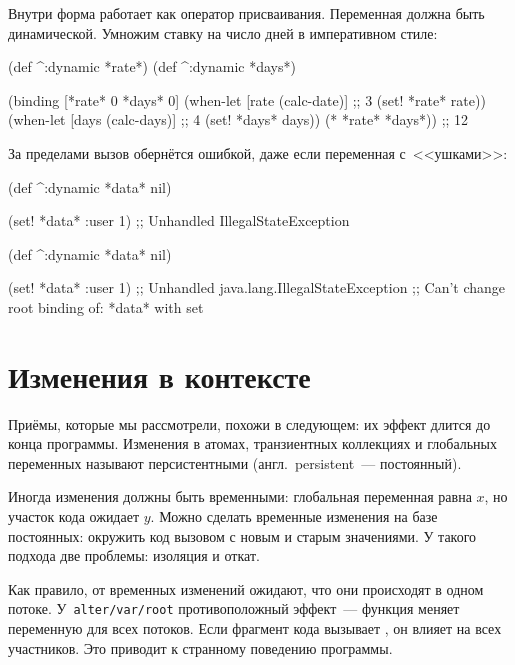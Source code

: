 \fi

Внутри  форма  работает как оператор
присваивания. Переменная должна быть динамической. Умножим ставку на число дней
в императивном стиле:

\begin{clojure}
(def ^:dynamic *rate*)
(def ^:dynamic *days*)

(binding [*rate* 0
          *days* 0]
  (when-let [rate (calc-date)] ;; 3
    (set! *rate* rate))
  (when-let [days (calc-days)] ;; 4
    (set! *days* days))
  (* *rate* *days*))
;; 12
\end{clojure}

За пределами  вызов  обернётся ошибкой, даже если
переменная с~<<ушками>>:

\ifnarrow

\begin{clojure}
(def ^:dynamic *data* nil)

(set! *data* {:user 1})
;; Unhandled IllegalStateException
\end{clojure}

\else

\begin{clojure}
(def ^:dynamic *data* nil)

(set! *data* {:user 1})
;; Unhandled java.lang.IllegalStateException
;; Can't change root binding of: *data* with set
\end{clojure}

\fi

\section{Изменения в контексте}


Приёмы, которые мы рассмотрели, похожи в следующем: их эффект длится до конца
программы. Изменения в атомах, транзиентных коллекциях и глобальных переменных
называют персистентными (англ.~persistent~--- постоянный).

Иногда изменения должны быть временными: глобальная переменная равна $x$, но
участок кода ожидает $y$. Можно сделать временные изменения на базе постоянных:
окружить код вызовом  с новым и старым значениями. У
такого подхода две проблемы: изоляция и откат.


Как правило, от временных изменений ожидают, что они происходят в одном
потоке. У~\texttt{alter\-/var\-/root} противоположный эффект~--- функция меняет
переменную для всех потоков. Если фрагмент кода вызывает ,
он влияет на всех участников. Это приводит к странному поведению программы.

